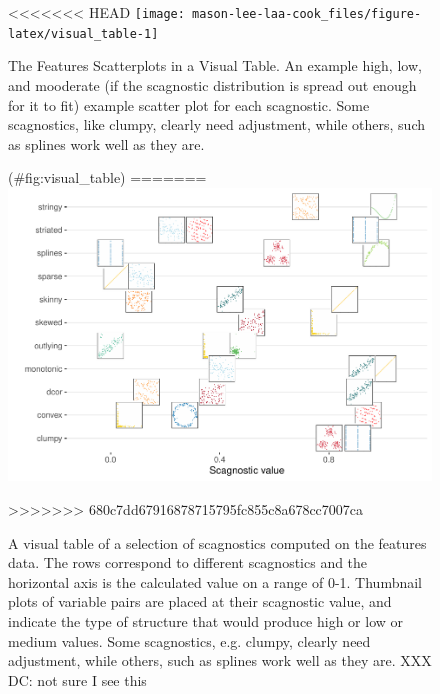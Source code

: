\begin{Schunk}
\begin{figure}
<<<<<<< HEAD
\texttt{[image: mason-lee-laa-cook\_files/figure-latex/visual\_table-1]} \caption[The Features Scatterplots in a Visual Table]{The Features Scatterplots in a Visual Table. An example high, low, and mooderate (if the scagnostic distribution is spread out enough for it to fit) example scatter plot for each scagnostic. Some scagnostics, like clumpy, clearly need adjustment, while others, such as splines work well as they are.}(\#fig:visual_table)
=======
\includegraphics[width=1\linewidth]{mason-lee-laa-cook_files/figure-latex/visual-table-1} \caption[A visual table of a selection of scagnostics computed on the features data]{A visual table of a selection of scagnostics computed on the features data. The rows correspond to different scagnostics and the horizontal axis is the calculated value on a range of 0-1. Thumbnail plots of variable pairs are placed at their scagnostic value, and indicate the type of structure that would produce high or low or medium values. Some scagnostics, e.g. clumpy, clearly need adjustment, while others, such as splines work well as they are. XXX DC: not sure I see this}\label{fig:visual-table}
>>>>>>> 680c7dd67916878715795fc855c8a678cc7007ca
\end{figure}
\end{Schunk}

